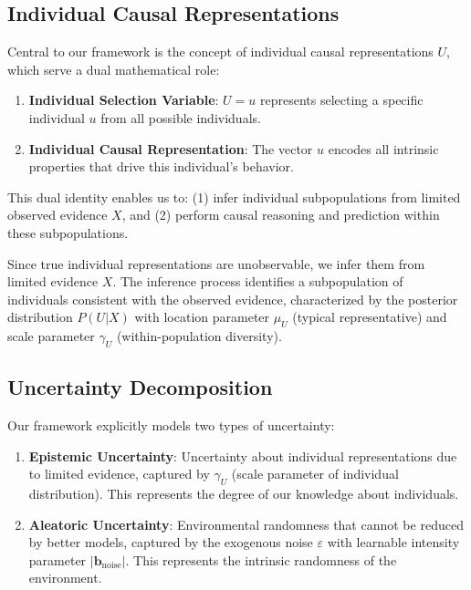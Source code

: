 \documentclass[conference]{IEEEtran}
\begin{document}
\subsection{Individual Causal Representations}

Central to our framework is the concept of individual causal representations $U$, which serve a dual mathematical role:

\begin{enumerate}
\item \textbf{Individual Selection Variable}: $U = u$ represents selecting a specific individual $u$ from all possible individuals.

\item \textbf{Individual Causal Representation}: The vector $u$ encodes all intrinsic properties that drive this individual's behavior.
\end{enumerate}

This dual identity enables us to: (1) infer individual subpopulations from limited observed evidence $X$, and (2) perform causal reasoning and prediction within these subpopulations.

Since true individual representations are unobservable, we infer them from limited evidence $X$. The inference process identifies a subpopulation of individuals consistent with the observed evidence, characterized by the posterior distribution $P(U|X)$ with location parameter $\mu_U$ (typical representative) and scale parameter $\gamma_U$ (within-population diversity).

\subsection{Uncertainty Decomposition}

Our framework explicitly models two types of uncertainty:

\begin{enumerate}
\item \textbf{Epistemic Uncertainty}: Uncertainty about individual representations due to limited evidence, captured by $\gamma_U$ (scale parameter of individual distribution). This represents the degree of our knowledge about individuals.

\item \textbf{Aleatoric Uncertainty}: Environmental randomness that cannot be reduced by better models, captured by the exogenous noise $\varepsilon$ with learnable intensity parameter $|\mathbf{b}_{\text{noise}}|$. This represents the intrinsic randomness of the environment.
\end{enumerate}
\end{document}
